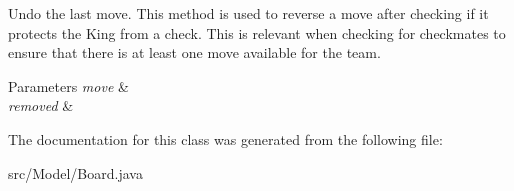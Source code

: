 Undo the last move. This method is used to reverse a move after checking if it protects the King from a check. This is relevant when checking for checkmates to ensure that there is at least one move available for the team. 
\begin{DoxyParams}{Parameters}
{\em move} & \\
\hline
{\em removed} & \\
\hline
\end{DoxyParams}


The documentation for this class was generated from the following file\+:\begin{DoxyCompactItemize}
\item 
src/\+Model/Board.\+java\end{DoxyCompactItemize}
